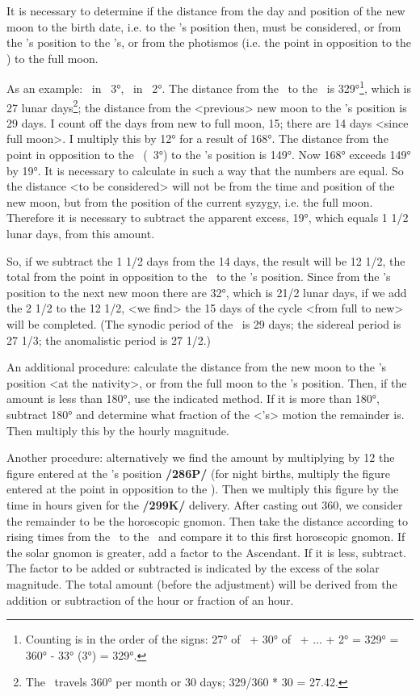 It is necessary to determine if the distance from the day and position of
the new moon to the birth date, i.e. to the \Moon’s position then, must be considered, or from the \Sun’s position to the \Moon’s, or from the photismos (i.e. the point in opposition to the \Sun) to the full moon.

As an example: \Sun\, in \Taurus\, 3°, \Moon\, in \Aries\, 2°. The distance from the \Sun\, to the \Moon\, is 329°\footnote{Counting is in the order of the signs: 27° of \Taurus\, + 30° of \Gemini\, + ... + 2° \Aries = 329° = 360° - 33° (3°\Taurus) = 329°.}, which is 27 lunar days\footnote{The \Moon\, travels 360° per month or 30 days; 329/360 * 30 = 27.42.}; the distance from the <previous> new moon to the \Moon’s position is 29 days. I count off the days from new to full moon, 15; there are 14 days <since full moon>. I multiply this by 12°
for a result of 168°. The distance from the point in opposition to the \Sun\, (\Scorpio\, 3°) to the \Moon’s position is 149°. Now 168° exceeds 149° by 19°. It is necessary to calculate in such a way that the
numbers are equal. So the distance <to be considered> will not be from the time and position of the new moon, but from the position of the current syzygy, i.e. the full moon. Therefore it is necessary to subtract the apparent excess, 19°, which equals 1 1/2 lunar days, from this amount. 

So, if we subtract the 1 1/2 days from the 14 days, the result will be 12 1/2, the total from the point in opposition to the \Sun\, to the \Moon’s position. Since from the \Moon’s position to the next new moon there are 32°, which is 21/2 lunar days, if we add the 2 1/2 to the 12 1/2, <we find> the 15 days of the cycle <from full to new> will be completed. (The synodic period of the \Moon\, is 29 days; the sidereal period is 27 1/3; the anomalistic period is 27 1/2.)

An additional procedure: calculate the distance from the new moon to the \Moon’s position <at the nativity>, or from the full moon to the \Moon’s position. Then, if the amount is less than 180°, use the
indicated method. If it is more than 180°, subtract 180° and determine what fraction of the <\Moon’s> motion the remainder is. Then multiply this by the hourly magnitude.

Another procedure: alternatively we find the amount by multiplying by 12 the figure entered at the \Sun’s position \textbf{/286P/} (for night births, multiply the figure entered at the point in opposition to the \Sun). Then we multiply this figure by the time in hours given for the \textbf{/299K/} delivery. After casting out 360, we consider the remainder to be the horoscopic gnomon. Then take the distance according to rising times from the \Sun\, to the \Moon\, and compare it to this first horoscopic gnomon. If the solar gnomon is greater, add a factor to the Ascendant. If it is less, subtract. The factor to be added or subtracted is indicated by the excess of the solar magnitude. The total amount (before the adjustment) will be derived from the addition or subtraction of the hour or fraction of an hour.

\newpage